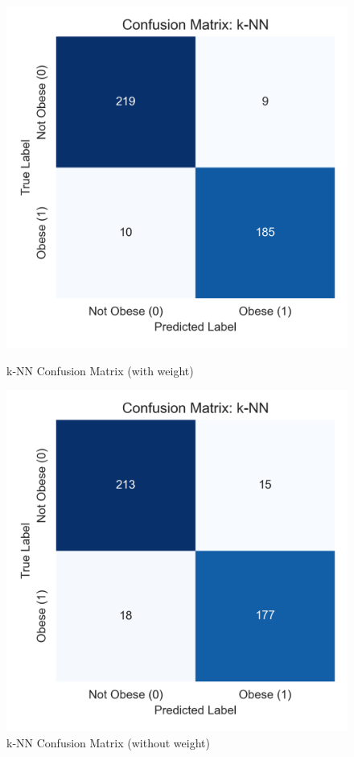 \documentclass[a4paper,12pt]{article}
\begin{document}
\begin{figure}[H]
\centering
\begin{minipage}{0.35\textwidth}
    \centering
    \includegraphics[width=\linewidth]{k-nn_confusion.png}
    \caption{k-NN Confusion Matrix (with weight)}
\end{minipage}
\hspace{0.04\textwidth}
\begin{minipage}{0.35\textwidth}
    \centering
    \includegraphics[width=\linewidth]{k-nn_confusion_withoutWeight.png}
    \caption{k-NN Confusion Matrix (without weight)}
\end{minipage}
\label{fig:k-nn_weight_comparison}
\end{figure}
\end{document}
